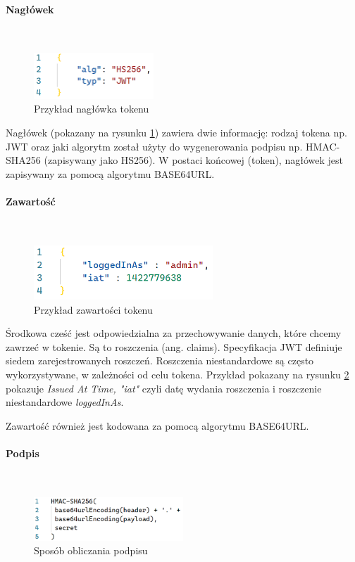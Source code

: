 \documentclass[12pt]{article}
\newcommand{\myparagraph}[1]{\paragraph{#1}\mbox{}\\}
\numberwithin{figure}{section}
\begin{document}
    \myparagraph{Nagłówek}
    \begin{figure}[H] 
     	\centering
    	\includegraphics[width=0.4\textwidth]{images/chapter_3/jwt-header.png}
    	\caption{Przykład nagłówka tokenu}
    	\label{fig:jwt-header}
    \end{figure}
    
    Nagłówek (pokazany na rysunku \ref{fig:jwt-header}) zawiera dwie informację: rodzaj tokena np. JWT oraz jaki algorytm został użyty do wygenerowania podpisu np. HMAC-SHA256 (zapisywany jako HS256). W postaci końcowej (token), nagłówek jest zapisywany za pomocą algorytmu BASE64URL.
    
    \myparagraph{Zawartość}
    \begin{figure}[H] 
     	\centering
    	\includegraphics[width=0.6\textwidth]{images/chapter_3/jwt-payload.png}
    	\caption{Przykład zawartości tokenu}
    	\label{fig:jwt-payload}
    \end{figure}
    
    Środkowa cześć jest odpowiedzialna za przechowywanie danych, które chcemy zawrzeć w tokenie. Są to roszczenia (ang. claims). Specyfikacja JWT definiuje siedem zarejestrowanych roszczeń. Roszczenia niestandardowe są często wykorzystywane, w zależności od celu tokena.
    Przykład pokazany na rysunku \ref{fig:jwt-payload} pokazuje \textit{Issued At Time, "iat"} czyli datę wydania roszczenia i roszczenie niestandardowe \textit{loggedInAs}.
    
    Zawartość również jest kodowana za pomocą algorytmu BASE64URL.
    \myparagraph{Podpis}

    \begin{figure}[H] 
     	\centering
    	\includegraphics[width=0.5\textwidth]{images/chapter_3/jwt-signature.png}
    	\caption{Sposób obliczania podpisu}
    	\label{fig:jwt-signature}
    \end{figure}
    
\end{document}
